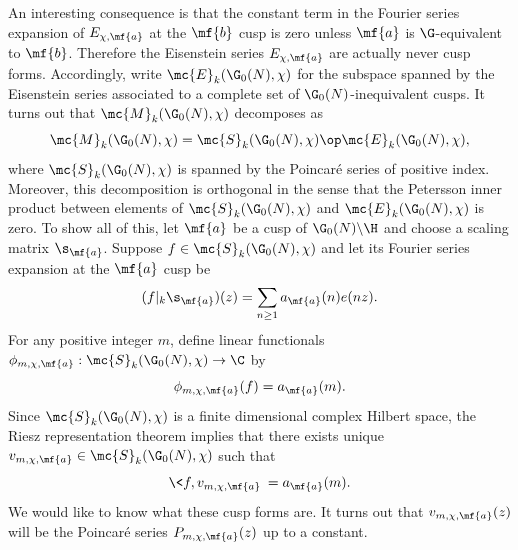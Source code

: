 \documentclass[12pt]{article}
\begin{document}
      An interesting consequence is that the constant term in the Fourier series expansion of \(E_{\chi,\mf{a}}\) at the \(\mf{b}\) cusp is zero unless \(\mf{a}\) is \(\G\)-equivalent to \(\mf{b}\). Therefore the Eisenstein series \(E_{\chi,\mf{a}}\) are actually never cusp forms. Accordingly, write \(\mc{E}_{k}(\G_{0}(N),\chi)\) for the subspace spanned by the Eisenstein series associated to a complete set of \(\G_{0}(N)\)-inequivalent cusps. It turns out that \(\mc{M}_{k}(\G_{0}(N),\chi)\) decomposes as
      \[
        \mc{M}_{k}(\G_{0}(N),\chi) = \mc{S}_{k}(\G_{0}(N),\chi) \op \mc{E}_{k}(\G_{0}(N),\chi),
      \]
      where \(\mc{S}_{k}(\G_{0}(N),\chi)\) is spanned by the Poincar\'e series of positive index. Moreover, this decomposition is orthogonal in the sense that the Petersson inner product between elements of \(\mc{S}_{k}(\G_{0}(N),\chi)\) and \(\mc{E}_{k}(\G_{0}(N),\chi)\) is zero. To show all of this, let \(\mf{a}\) be a cusp of \(\G_{0}(N)\backslash\H\) and choose a scaling matrix \(\s_{\mf{a}}\). Suppose \(f \in \mc{S}_{k}(\G_{0}(N),\chi)\) and let its Fourier series expansion at the \(\mf{a}\) cusp be
      \[
        (f|_{k}\s_{\mf{a}})(z) = \sum_{n \ge 1}a_{\mf{a}}(n)e(nz).
      \]
      For any positive integer \(m\), define linear functionals \(\phi_{m,\chi,\mf{a}}:\mc{S}_{k}(\G_{0}(N),\chi) \to \C\) by 
      \[
        \phi_{m,\chi,\mf{a}}(f) = a_{\mf{a}}(m).
      \]
      Since \(\mc{S}_{k}(\G_{0}(N),\chi)\) is a finite dimensional complex Hilbert space, the Riesz representation theorem implies that there exists unique \(v_{m,\chi,\mf{a}} \in \mc{S}_{k}(\G_{0}(N),\chi)\) such that
      \[
        \<f,v_{m,\chi,\mf{a}}\> = a_{\mf{a}}(m).
      \]
      We would like to know what these cusp forms are. It turns out that \(v_{m,\chi,\mf{a}}(z)\) will be the Poincar\'e series \(P_{m,\chi,\mf{a}}(z)\) up to a constant.
\end{document}
